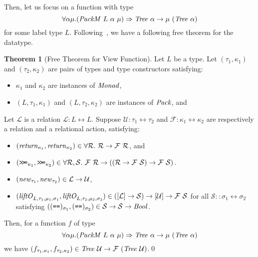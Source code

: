 \documentclass{article}
\theoremstyle{definition}
\newtheorem{theorem}{Theorem}
\newcommand{\BIND}{\mathbin{\texttt{>\!>\!=}}}
\newcommand{\BETWEEN}{\leftrightarrow}
\newcommand{\texteq}{\mathrel{\texttt{==}}}
\begin{document}
Then, let us focus on a function with type 
\[
\forall \alpha \mu. (\mathit{PackM}~L~\alpha~\mu) \Rightarrow 
 \mathit{Tree}~\alpha \to \mu~(\mathit{Tree}~\alpha)
\]
for some label type $L$.
Following~\cite{Voigtlander09ft}, we have a following free theorem for the datatype.
\begin{theorem}[Free Theorem for View Function]
Let $L$ be a type. 
Let $(\tau_1,\kappa_1)$ and $(\tau_2,\kappa_2)$ are pairs of types and type constructors satisfying:
\begin{itemize}
 \item $\kappa_1$ and $\kappa_2$ are instances of $\mathit{Monad}$, 
 \item $(L,\tau_1, \kappa_1)$ and $(L,\tau_2, \kappa_2)$ are instances of $\mathit{Pack}$, and 
\end{itemize}
Let $\mathcal{L}$ is a relation $\mathcal{L} : L \BETWEEN L$.
Suppose $\mathcal{U} : \tau_1 \BETWEEN \tau_2$
and $\mathcal{F} : \kappa_1 \BETWEEN \kappa_2$ are
respectively a relation and a relational action, satisfying:
\begin{itemize}%
  \item $(\mathit{return}_{\kappa_1}, \mathit{return}_{\kappa_2}) \in 
         \forall \mathcal{R}.~\mathcal{R} \to \mathcal{F}~\mathcal{R}$, and
  \item $(\BIND_{\kappa_1}, \BIND_{\kappa_2}) \in 
    \forall \mathcal{R},\mathcal{S}.~ \mathcal{F}~\mathcal{R} \to ((\mathcal{R} \to \mathcal{F}~\mathcal{S}) \to \mathcal{F}~\mathcal{S})$.
 \item $(\mathit{new}_{\tau_1},\mathit{new}_{\tau_2}) \in \mathcal{L} \to \mathcal{U}$,
 \item $(\mathit{liftO}_{L,\tau_1,\mu_1,\sigma_1},\mathit{liftO}_{L,\tau_2,\mu_2,\sigma_2}) \in ([\mathcal{L}] \to \mathcal{S}) \to [\mathcal{U}] \to \mathcal{F}~\mathcal{S}$
   for all $\mathcal{S} :: \sigma_1 \BETWEEN \sigma_2$ satisfying 
   $((\texteq)_{\sigma_1},(\texteq)_{\sigma_2}) \in \mathcal{S} \to \mathcal{S} \to \mi{Bool}$.
\end{itemize}
Then, for a function $f$ of type 
\[
\forall \alpha \mu. (\mathit{PackM}~L~\alpha~\mu) \Rightarrow 
 \mathit{Tree}~\alpha \to \mu~(\mathit{Tree}~\alpha)
\]
we have $(f_{\tau_1,\kappa_1},f_{\tau_2,\kappa_2}) \in \mathit{Tree}~\mathcal{U} \to \mathcal{F}~(\mathit{Tree}~\mathcal{U})$.\qed
\label{thm:ft}
\end{theorem}
\end{document}
